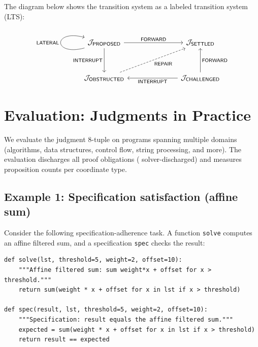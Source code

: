\documentclass[11pt]{article}
\begin{document}
The diagram below shows the transition system as a labeled transition
system (LTS):

\begin{equation}\label{eq:lts}
\begin{tikzcd}[column sep=2.5cm, row sep=1.2cm]
  \J_{\mathsf{PROPOSED}}
    \arrow[r, "\mathsf{FORWARD}"]
    \arrow[d, "\mathsf{INTERRUPT}"']
    \arrow[loop left, "\mathsf{LATERAL}"]
  & \J_{\mathsf{SETTLED}} \\
  \J_{\mathsf{OBSTRUCTED}}
    \arrow[ur, dashed, "\mathsf{REPAIR}"']
  & \J_{\mathsf{CHALLENGED}}
    \arrow[l, "\mathsf{INTERRUPT}"]
    \arrow[u, "\mathsf{FORWARD}"']
\end{tikzcd}
\end{equation}


\section{Evaluation: Judgments in Practice}\label{sec:evaluation}

We evaluate the judgment 8-tuple on \compTotalPrograms{} \Python{} programs
spanning multiple domains (algorithms, data structures, control flow,
string processing, and more).  The evaluation
discharges all \compTrustTotal{} proof obligations
(\compTrustSolverdischargedPct{} solver-discharged) and measures
proposition counts per coordinate type.

\subsection{Example 1: Specification satisfaction (affine sum)}

Consider the following specification-adherence task.  A function
\texttt{solve} computes an affine filtered sum, and a specification
\texttt{spec} checks the result:

\begin{lstlisting}[caption={Affine sum with specification.}]
def solve(lst, threshold=5, weight=2, offset=10):
    """Affine filtered sum: sum weight*x + offset for x > threshold."""
    return sum(weight * x + offset for x in lst if x > threshold)

def spec(result, lst, threshold=5, weight=2, offset=10):
    """Specification: result equals the affine filtered sum."""
    expected = sum(weight * x + offset for x in lst if x > threshold)
    return result == expected
\end{lstlisting}
\end{document}
